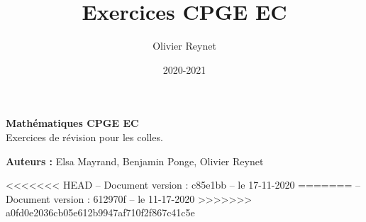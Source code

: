 \documentclass[french,12pt,a4paper]{book}
\author{Olivier Reynet}
\title{Exercices CPGE EC}
\date{2020-2021}
\begin{document}
	
	\begin{titlepage}
		\begin{center}
			\vspace*{5cm}
			
			\textbf{\Huge Mathématiques CPGE EC\\}
					   \vspace{1cm}
			Exercices de révision pour les colles. 

							\vfill
			
			\textbf{Auteurs : } Elsa Mayrand, Benjamin Ponge, Olivier Reynet
			

					\vfill
		
			

	
			\date{}
		   \vspace{0.5cm}
<<<<<<< HEAD
			 -- Document version : c85e1bb -- le  17-11-2020
=======
			 -- Document version : 612970f -- le  11-17-2020
>>>>>>> a0fd0e2036cb05e612b9947af710f2f867c41c5e
			\vspace{1.5cm}
		\end{center}
	\end{titlepage}
	

	\tableofcontents
	
	
	
	
	
	
    
\end{document}
